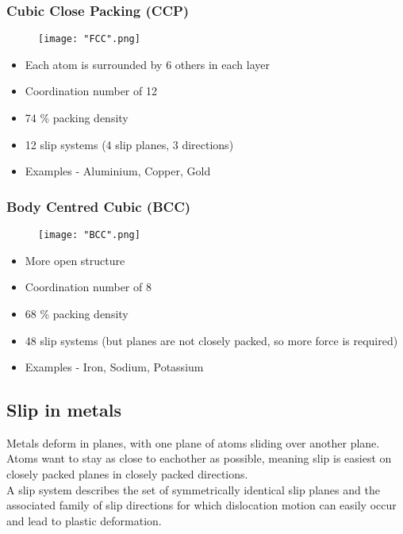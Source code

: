 \documentclass[a4paper, 12pt]{article}
\begin{document}
				\subsubsection*{Cubic Close Packing (CCP)}
					\begin{figure}[!ht]	
						\texttt{[image: "FCC".png]}
					\end{figure}
					
					\begin{itemize}
						\item Each atom is surrounded by 6 others in each layer
						\item Coordination number of 12
						\item 74 \% packing density
						\item 12 slip systems (4 slip planes, 3 directions)
						\item Examples - Aluminium, Copper, Gold
					\end{itemize}
					
				\subsubsection*{Body Centred Cubic (BCC)}
					\begin{figure}[!ht]
						\texttt{[image: "BCC".png]}
					\end{figure}
					
					\begin{itemize} 
						\item More open structure
						\item Coordination number of 8
						\item 68 \% packing density
						\item 48 slip systems (but planes are not closely packed, so more force is required)
						\item Examples - Iron, Sodium, Potassium
					\end{itemize}
					
		\subsection{Slip in metals}
			Metals deform in planes, with one plane of atoms sliding over another plane.  Atoms want to stay as close to eachother as possible, meaning slip is easiest on closely packed planes in closely packed directions. \\
			A slip system describes the set of symmetrically identical slip planes and the associated family of slip directions for which dislocation motion can easily occur and lead to plastic deformation. 
\end{document}
